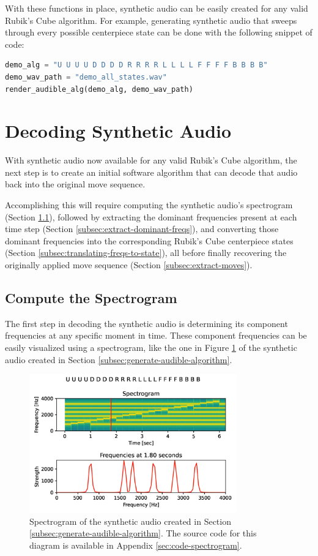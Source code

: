 With these functions in place, synthetic audio can be easily created for any valid Rubik's Cube algorithm. For example, generating synthetic audio that sweeps through every possible centerpiece state can be done with the following snippet of code:

\begin{lstlisting}[language=Python]
demo_alg = "U U U U D D D D R R R R L L L L F F F F B B B B"
demo_wav_path = "demo_all_states.wav"
render_audible_alg(demo_alg, demo_wav_path)
\end{lstlisting}


\section{Decoding Synthetic Audio}
\label{sec:decoding-synthetic-audio}
With synthetic audio now available for any valid Rubik's Cube algorithm, the next step is to create an initial software algorithm that can decode that audio back into the original move sequence.

Accomplishing this will require computing the synthetic audio's spectrogram (Section \ref{subsec:compute-spectrogram}), followed by extracting the dominant frequencies present at each time step (Section \ref{subsec:extract-dominant-freqs}), and converting those dominant frequencies into the corresponding Rubik's Cube centerpiece states (Section \ref{subsec:translating-freqs-to-state}), all before finally recovering the originally applied move sequence (Section \ref{subsec:extract-moves}).

\newpage
\subsection{Compute the Spectrogram}
\label{subsec:compute-spectrogram}
The first step in decoding the synthetic audio is determining its component frequencies at any specific moment in time.
These component frequencies can be easily visualized using a spectrogram, like the one in Figure \ref{fig:spectrogram} of the synthetic audio created in Section \ref{subsec:generate-audible-algorithm}.

\begin{figure}[h]
    \centering
    \includegraphics[width=0.8\textwidth]{Figures/5 Algorithm Design/component_frequencies.png}
    \caption{Spectrogram of the synthetic audio created in Section \ref{subsec:generate-audible-algorithm}. The source code for this diagram is available in Appendix \ref{sec:code-spectrogram}.}
    \label{fig:spectrogram}
\end{figure}

